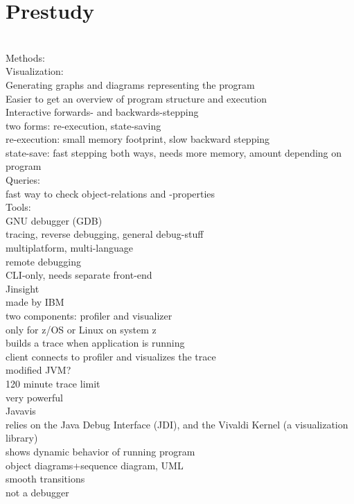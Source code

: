 \section{Prestudy}\label{Prestudy}
~\\

Methods:\\

Visualization:\\
	Generating graphs and diagrams representing the program\\
	Easier to get an overview of program structure and execution\\

Interactive forwards- and backwards-stepping\\
	two forms: re-execution, state-saving\\
	re-execution: small memory footprint,  slow backward stepping\\
	state-save: fast stepping both ways, needs more memory, amount depending on program\\

Queries:\\
	fast way to check object-relations and -properties\\

Tools:\\

GNU debugger (GDB)\\
	tracing, reverse debugging, general debug-stuff\\
	multiplatform, multi-language\\
	remote debugging\\
	CLI-only, needs separate front-end\\

Jinsight\\
	made by IBM\\
	two components: profiler and visualizer\\
	only for z/OS or Linux on system z\\
	builds a trace when application is running\\
	client connects to profiler and visualizes the trace\\
	modified JVM?\\
	120 minute trace limit\\
	very powerful\\

Javavis\\
	relies on the Java Debug Interface (JDI), and the Vivaldi Kernel (a visualization library)\\
	shows dynamic behavior of running program\\
	object diagrams+sequence diagram, UML\\
	smooth transitions\\
	not a debugger\\
	
